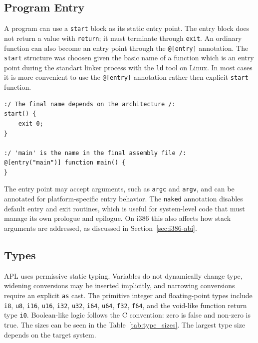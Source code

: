 \documentclass[10pt,twocolumn]{article}
\begin{document}
\subsection{Program Entry}
\par A program can use a \texttt{start} block as its static entry point. The entry block does not return a value with \texttt{return}; it must terminate through \texttt{exit}. An ordinary function can also become an entry point through the \texttt{@[entry]} annotation. The \texttt{start} structure was choosen given the basic name of a function which is an entry point during the standart linker process with the \texttt{ld} tool on Linux. In most cases it is more convenient to use the \texttt{@[entry]} annotation rather then explicit \texttt{start} function.

\FloatBarrier
\begin{lstlisting}[language=APL,caption={Minimal APL entry point.}]
:/ The final name depends on the architecture /:
start() {
    exit 0;
}

:/ 'main' is the name in the final assembly file /:
@[entry("main")] function main() {
}
\end{lstlisting}
\FloatBarrier

\par The entry point may accept arguments, such as \texttt{argc} and \texttt{argv}, and can be annotated for platform-specific entry behavior. The \texttt{naked} annotation disables default entry and exit routines, which is useful for system-level code that must manage its own prologue and epilogue. On i386 this also affects how stack arguments are addressed, as discussed in Section~\ref{sec:i386-abi}.

\subsection{Types}
\par APL uses permissive static typing. Variables do not dynamically change type, widening conversions may be inserted implicitly, and narrowing conversions require an explicit \texttt{as} cast. The primitive integer and floating-point types include \texttt{i8}, \texttt{u8}, \texttt{i16}, \texttt{u16}, \texttt{i32}, \texttt{u32}, \texttt{i64}, \texttt{u64}, \texttt{f32}, \texttt{f64}, and the void-like function return type \texttt{i0}. Boolean-like logic follows the C convention: zero is false and non-zero is true. The sizes can be seen in the Table~\ref{tab:type_sizes}. The largest type size depends on the target system.
\end{document}
